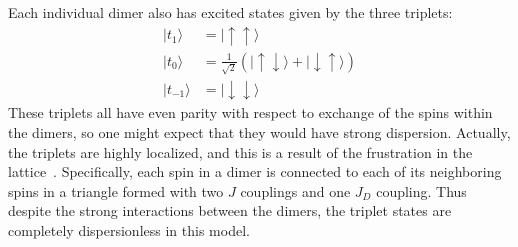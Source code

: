 \documentclass{thesis-umich}
\begin{document}
Each individual dimer also has excited states given by the three triplets:
\begin{align*}
	| t_1 \rangle &= | \uparrow \uparrow \rangle \\ 
	| t_0 \rangle &= \frac{1}{\sqrt{2}} (| \uparrow \downarrow \rangle + | \downarrow \uparrow \rangle) \\
	| t_{-1} \rangle &= | \downarrow \downarrow \rangle
\end{align*}
These triplets all have even parity with respect to exchange of the spins within the dimers, so one might expect that they would have strong dispersion. Actually, the triplets are highly localized, and this is a result of the frustration in the lattice~\cite{Kageyama2005}. Specifically, each spin in a dimer is connected to each of its neighboring spins in a triangle formed with two $J$ couplings and one $J_D$ coupling. Thus despite the strong interactions between the dimers, the triplet states are completely dispersionless in this model.
\end{document}
